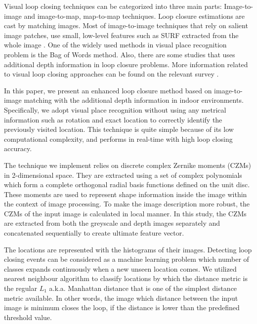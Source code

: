 \documentclass[]{spie}  %
\begin{document}
Visual loop closing techniques can be categorized into three main parts\cite{Williams09}: Image-to-image and image-to-map, map-to-map techniques. Loop closure estimations\cite{sariyanidi_spie13}  are cast by matching images. Most of image-to-image techniques that rely on salient image patches, use small, low-level features such as SURF\cite{Bay06surf:speeded} extracted from the whole image \cite{sariyanidi_iv, HoNewmanCIRA2005, CumminsNewmanIJRR08}. One of the widely used methods in visual place recognition problem is the Bag of Words\cite{Csurka04visualcategorization} method. Also, there are some studies that uses additional depth information\cite{kerl2013-IROS} in loop closure problems. More information related to visual loop closing approaches can be found on the relevant survey \cite{Williams09}.

In this paper, we present an enhanced loop closure method based on image-to-image matching with the additional depth information in indoor environments. Specifically, we adopt visual place recognition without using any metrical information such as rotation and exact location to correctly identify the previously visited location. This technique is quite simple because of its low computational complexity, and performs in real-time with high loop closing accuracy. 

The technique we implement relies on discrete complex Zernike moments (CZMs) in 2-dimensional space. They are extracted using a set of complex polynomials which form a complete orthogonal radial basis functions defined on the unit disc. These moments are used to represent shape information inside the image within the context of image processing. To make the image description more robust, the CZMs of the input image is calculated in local manner. In this study, the CZMs are extracted from both the greyscale and depth images separately and concatenated sequentially to create ultimate feature vector.

The locations are represented with the histograms of their images. Detecting loop closing events can be considered as a machine learning problem which number of classes expands continuously when a new unseen location comes. We utilized nearest neighbour algorithm to classify locations by which the distance metric is the regular $L_1$ a.k.a. Manhattan distance that is one of the simplest distance metric available. In other words, the image which distance between the input image is minimum closes the loop, if the distance is lower than the predefined threshold value. 
\end{document}
